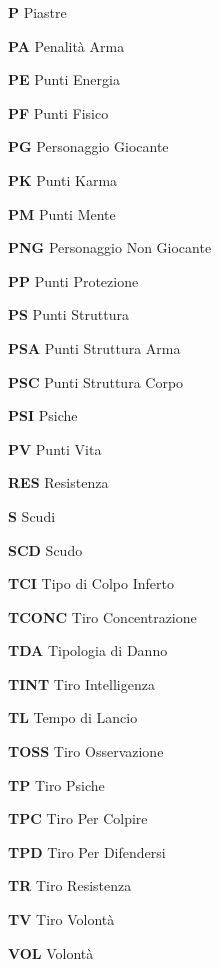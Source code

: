 \begin{description}
\item{\bf P} Piastre 
\item{\bf PA} Penalit\`a Arma 
\item{\bf PE} Punti Energia 
\item{\bf PF} Punti Fisico 
\item{\bf PG} Personaggio Giocante 
\item{\bf PK} Punti Karma 
\item{\bf PM} Punti Mente 
\item{\bf PNG} Personaggio Non Giocante 
\item{\bf PP} Punti Protezione 
\item{\bf PS} Punti Struttura
\item{\bf PSA} Punti Struttura Arma 
\item{\bf PSC} Punti Struttura Corpo 
\item{\bf PSI} Psiche 
\item{\bf PV} Punti Vita
\item{\bf RES} Resistenza 
\item{\bf S} Scudi 
\item{\bf SCD} Scudo 
\item{\bf TCI} Tipo di Colpo Inferto 
\item{\bf TCONC} Tiro Concentrazione
\item{\bf TDA} Tipologia di Danno 
\item{\bf TINT} Tiro Intelligenza 
\item{\bf TL} Tempo di Lancio 
\item{\bf TOSS} Tiro Osservazione 
\item{\bf TP} Tiro Psiche 
\item{\bf TPC} Tiro Per Colpire 
\item{\bf TPD} Tiro Per Difendersi
\item{\bf TR} Tiro Resistenza 
\item{\bf TV} Tiro Volont\`a 
\item{\bf VOL} Volont\`a
\end{description}
